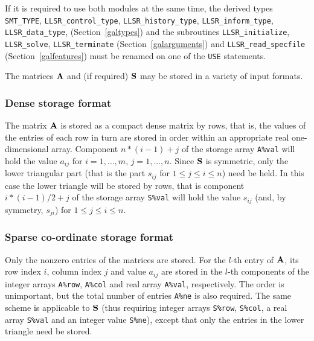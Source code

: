 \documentclass{galahad}
\newcommand{\packagename}{LLSR}
\begin{document}
\medskip

\noindent
If it is required to use both modules at the same time, the derived types
{\tt SMT\_TYPE},
{\tt \packagename\_control\_type},
{\tt \packagename\_history\_\-type},
{\tt \packagename\_inform\_type},
{\tt \packagename\_data\_type},
(Section~\ref{galtypes})
and the subroutines
{\tt \packagename\_initialize},
{\tt \packagename\_solve}, {\tt \packagename\_\-terminate}
(Section~\ref{galarguments})
and
{\tt \packagename\_read\_specfile}
(Section~\ref{galfeatures})
must be renamed on one of the {\tt USE} statements.


\galmatrix
The matrices ${\mathbf{A}}$ and (if required) ${\mathbf{S}}$
may be stored in a variety of input formats.

\subsubsection{Dense storage format}\label{dense}
The matrix ${\mathbf{A}}$ is stored as a compact
dense matrix by rows, that is, the values of the entries of each row in turn are
stored in order within an appropriate real one-dimensional array.
Component $n \ast (i-1) + j$ of the storage array {\tt A\%val} will hold the
value $a_{ij}$ for $i = 1, \ldots , m$, $j = 1, \ldots , n$.
Since ${\mathbf{S}}$ is symmetric, only the lower triangular part (that is the part
$s_{ij}$ for $1 \leq j \leq i \leq n$) need be held. In this case
the lower triangle will be stored by rows, that is
component $i \ast (i-1)/2 + j$ of the storage array {\tt S\%val}
will hold the value $s_{ij}$ (and, by symmetry, $s_{ji}$)
for $1 \leq j \leq i \leq n$.

\subsubsection{Sparse co-ordinate storage format}\label{coordinate}
Only the nonzero entries of the matrices are stored. For the
$l$-th entry of ${\mathbf{A}}$, its row index $i$, column index $j$
and value $a_{ij}$
are stored in the $l$-th components of the integer arrays {\tt A\%row},
{\tt A\%col} and real array {\tt A\%val}, respectively.
The order is unimportant, but the total
number of entries {\tt A\%ne} is also required.
The same scheme is applicable to
${\mathbf{S}}$ (thus requiring integer arrays {\tt S\%row}, {\tt S\%col}, a real array
{\tt S\%val} and an integer value {\tt S\%ne}),
except that only the entries in the lower triangle need be stored.
\end{document}

